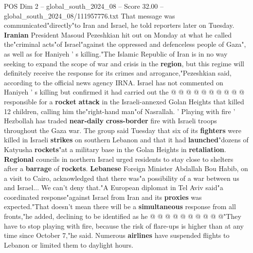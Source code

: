 \begin{textsample}{POS Dim 2 – global\_south\_2024\_08 – Score 32.00 – global\_south\_2024\_08/111957776.txt}
That message was communicated"directly"to Iran and Israel, he told reporters later on Tuesday. \textbf{Iranian} President Masoud Pezeshkian hit out on Monday at what he called the"criminal acts"of Israel"against the oppressed and defenceless people of Gaza", as well as for Haniyeh ' s killing."The Islamic Republic of Iran is in no way seeking to expand the scope of war and crisis in the \textbf{region}, but this regime will definitely receive the response for its crimes and arrogance,"Pezeshkian said, according to the official news agency IRNA.
Israel has not commented on Haniyeh ' s killing but confirmed it had carried out the @ @ @ @ @ @ @ @ @ @ responsible for a \textbf{rocket} \textbf{attack} in the Israeli-annexed Golan Heights that killed 12 children, calling him the"right-hand man"of Nasrallah. ' Playing with fire ' Hezbollah has traded \textbf{near-daily} \textbf{cross-border} fire with Israeli troops throughout the Gaza war.
The group said Tuesday that six of its \textbf{fighters} were killed in Israeli \textbf{strikes} on southern Lebanon and that it had \textbf{launched}"dozens of Katyusha \textbf{rockets}"at a military base in the Golan Heights in \textbf{retaliation}. \textbf{Regional} councils in northern Israel urged residents to stay close to shelters after a \textbf{barrage} of \textbf{rockets}. \textbf{Lebanese} Foreign Minister Abdallah Bou Habib, on a visit to Cairo, acknowledged that there was"a possibility of a war between us and Israel...
We can't deny that."A European diplomat in Tel Aviv said"a coordinated response"against Israel from Iran and its \textbf{proxies} was expected."That doesn't mean there will be a \textbf{simultaneous} response from all fronts,"he added, declining to be identified as he @ @ @ @ @ @ @ @ @ @"They have to stop playing with fire, because the risk of flare-ups is higher than at any time since October 7,"he said.
Numerous \textbf{airlines} have suspended flights to Lebanon or limited them to daylight hours.

\end{textsample}

